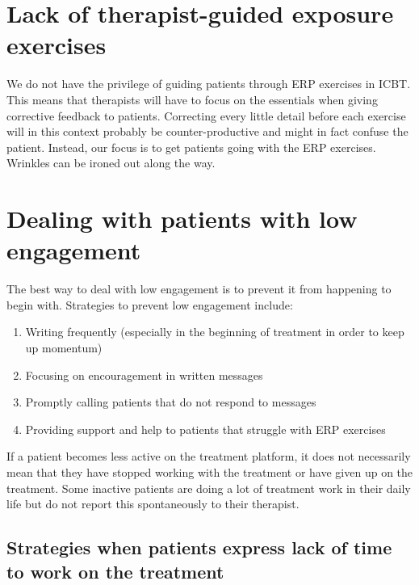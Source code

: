 \documentclass[]{book}
\providecommand{\tightlist}{%
  \setlength{\itemsep}{0pt}\setlength{\parskip}{0pt}}
\theoremstyle{definition}
\theoremstyle{definition}
\theoremstyle{definition}
\theoremstyle{remark}
\begin{document}
\hypertarget{lack-of-therapist-guided-exposure-exercises}{%
\section{Lack of therapist-guided exposure
exercises}\label{lack-of-therapist-guided-exposure-exercises}}

We do not have the privilege of guiding patients through ERP exercises
in ICBT. This means that therapists will have to focus on the essentials
when giving corrective feedback to patients. Correcting every little
detail before each exercise will in this context probably be
counter-productive and might in fact confuse the patient. Instead, our
focus is to get patients going with the ERP exercises. Wrinkles can be
ironed out along the way.

\hypertarget{dealing-with-patients-with-low-engagement}{%
\section{Dealing with patients with low
engagement}\label{dealing-with-patients-with-low-engagement}}

The best way to deal with low engagement is to prevent it from happening
to begin with. Strategies to prevent low engagement include:

\begin{enumerate}
\def\labelenumi{\arabic{enumi}.}
\tightlist
\item
  Writing frequently (especially in the beginning of treatment in order
  to keep up momentum)
\item
  Focusing on encouragement in written messages
\item
  Promptly calling patients that do not respond to messages
\item
  Providing support and help to patients that struggle with ERP
  exercises
\end{enumerate}

If a patient becomes less active on the treatment platform, it does not
necessarily mean that they have stopped working with the treatment or
have given up on the treatment. Some inactive patients are doing a lot
of treatment work in their daily life but do not report this
spontaneously to their therapist.

\hypertarget{strategies-when-patients-express-lack-of-time-to-work-on-the-treatment}{%
\subsection{Strategies when patients express lack of time to work on the
treatment}\label{strategies-when-patients-express-lack-of-time-to-work-on-the-treatment}}
\end{document}
